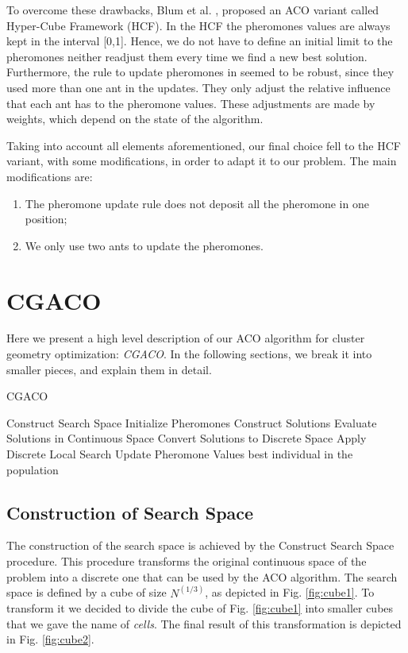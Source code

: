 	To overcome these drawbacks, Blum et al. \cite{blum04}, proposed an ACO variant called Hyper-Cube Framework (HCF). In the HCF the pheromones values are always kept in the interval [0,1]. Hence, we do not have to define an initial limit to the pheromones neither readjust them every time we find a new best solution. Furthermore, the rule to update pheromones in \cite{blum04} seemed to be robust, since they used more than one ant in the updates. They only adjust the relative influence that each ant has to the pheromone values. These adjustments are made by weights, which depend on the state of the algorithm.

	Taking into account all elements aforementioned, our final choice fell to the HCF variant, with some modifications, in order to adapt it to our problem. The main modifications are:
	\begin{enumerate}
		\item The pheromone update rule does not deposit all the pheromone in one position;
		\item We only use two ants to update the pheromones.
	\end{enumerate}
	\pagebreak
	\section{CGACO}
	Here we present a high level description of our ACO algorithm for cluster geometry optimization: \emph{CGACO}. In the following sections, we break it into smaller pieces, and explain them in detail.
	
	\begin{algorithm}
		\caption{CGACO}
		\label{alg:cgaco}
		\begin{algorithmic}
		\STATE Construct Search Space
		\STATE Initialize Pheromones
			\STATE Construct Solutions
			\STATE Evaluate Solutions in Continuous Space
			\STATE Convert Solutions to Discrete Space
			\STATE Apply Discrete Local Search
			\STATE Update Pheromone Values
		\ENDWHILE
		\RETURN best individual in the population
		\end{algorithmic}
	\end{algorithm}
	
	\subsection{Construction of Search Space}
	
	The construction of the search space is achieved by the Construct Search Space procedure. This procedure transforms the original continuous space of the problem into a discrete one that can be used by the ACO algorithm. 
	The search space is defined by a cube of size $N^{(1/3)}$, as depicted in Fig. \ref{fig:cube1}. To transform it we decided to divide the cube of Fig. \ref{fig:cube1} into smaller cubes that we gave the name of \emph{cells}. The final result of this transformation is depicted in Fig. \ref{fig:cube2}.  
	
